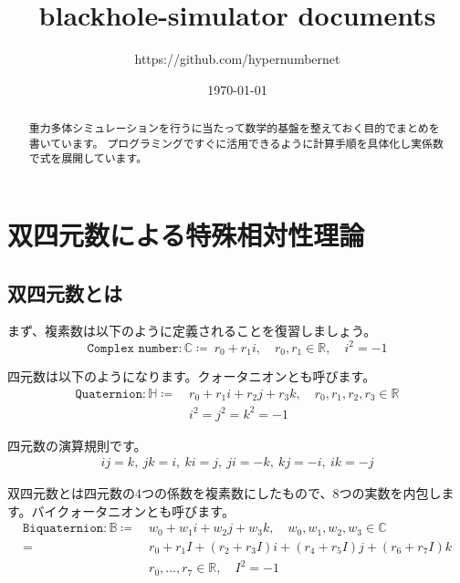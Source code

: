 \documentclass[a4paper,12pt,notitlepage]{jsreport}
\title{blackhole-simulator documents}
\author{https://github.com/hypernumbernet}
\date{\today}
\begin{document}
\maketitle

\begin{abstract}
重力多体シミュレーションを行うに当たって数学的基盤を整えておく目的でまとめを書いています。
プログラミングですぐに活用できるように計算手順を具体化し実係数で式を展開しています。
\end{abstract}

\chapter{双四元数による特殊相対性理論}

\section{双四元数とは}

まず、複素数は以下のように定義されることを復習しましょう。
\begin{equation}
\texttt{Complex number}:\mathbb{C}\coloneq ~r_0+r_1i,\quad r_0,r_1\in\mathbb{R},\quad i^2=-1
\end{equation}

四元数は以下のようになります。クォータニオンとも呼びます。
\begin{equation}
\begin{split}
\texttt{Quaternion}:\mathbb{H}\coloneq ~&r_0+r_1i+r_2j+r_3k,\quad r_0,r_1,r_2,r_3\in\mathbb{R}\\
&i^2=j^2=k^2=-1
\end{split}
\end{equation}

四元数の演算規則です。
\begin{gather}
ij=k,~jk=i,~ki=j,~ji=-k,~kj=-i,~ik=-j
\end{gather}

双四元数とは四元数の4つの係数を複素数にしたもので、8つの実数を内包します。バイクォータニオンとも呼びます。
\begin{equation}
\begin{split}
\texttt{Biquaternion}:\mathbb{B}\coloneq ~&w_0+w_1i+w_2j+w_3k,\quad w_0,w_1,w_2,w_3\in\mathbb{C}\\
=~&r_0+r_1I+(r_2+r_3I)i+(r_4+r_5I)j+(r_6+r_7I)k\\
&r_0,...,r_7\in\mathbb{R},\quad I^2=-1
\end{split}
\end{equation}
\end{document}
